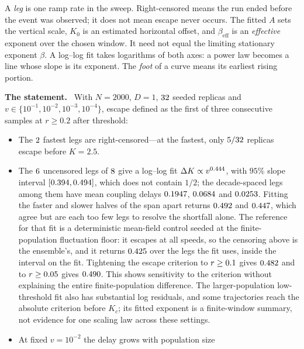 \documentclass[11pt]{article}
\newcommand{\statement}{\par\smallskip\noindent\textbf{The statement.}\ }
\begin{document}
A \emph{leg} is one ramp rate in the sweep. Right-censored means the run ended
before the event was observed; it does not mean escape never occurs.
The fitted $A$ sets the vertical scale, $K_0$ is an estimated horizontal
offset, and $\beta_{\mathrm{eff}}$ is an \emph{effective} exponent over the
chosen window. It need not equal the limiting stationary exponent $\beta$.
A log--log fit takes logarithms of both axes: a power law becomes a line whose
slope is its exponent. The \emph{foot} of a curve means its earliest rising
portion.

\statement
With $N=2000$, $D=1$, $32$ seeded replicas and
$v\in\{10^{-1},10^{-2},10^{-3},10^{-4}\}$, escape defined as the first of three
consecutive samples at $r\ge0.2$ after threshold:

\begin{itemize}[leftmargin=*,noitemsep]
\item The $2$ fastest legs are right-censored---at the
fastest, only $5/32$ replicas escape before $K=2.5$.
\item The $6$ uncensored legs of
$8$ give a log--log fit
$\Delta K\propto v^{0.444}$, with $95\%$ slope interval
$[0.394,0.494]$, which does not contain $1/2$; the
decade-spaced legs among them have mean coupling delays $0.1947$,
$0.0684$ and $0.0253$. Fitting the faster and slower
halves of the span apart returns $0.492$ and
$0.447$, which agree but are each too few legs to resolve the
shortfall alone. The reference for that fit is a deterministic mean-field
control seeded at the finite-population fluctuation floor: it escapes at all
\quasistaticSpeedCount{} speeds, so the censoring above is the ensemble's, and
it returns $0.425$ over the \quasistaticUncensoredCount{}
legs the fit uses, inside the interval on the fit. Tightening the escape
criterion to $r\geq0.1$ gives $0.482$
and to $r\geq0.05$ gives $0.490$.
This shows sensitivity to the criterion without explaining the entire
finite-population difference. The larger-population low-threshold fit also
has substantial log residuals, and some trajectories reach the absolute
criterion before $K_c$; its fitted exponent is a finite-window summary,
not evidence for one scaling law across these settings.
\item At fixed $v=10^{-2}$ the delay grows with population size

\end{itemize}
\end{document}
